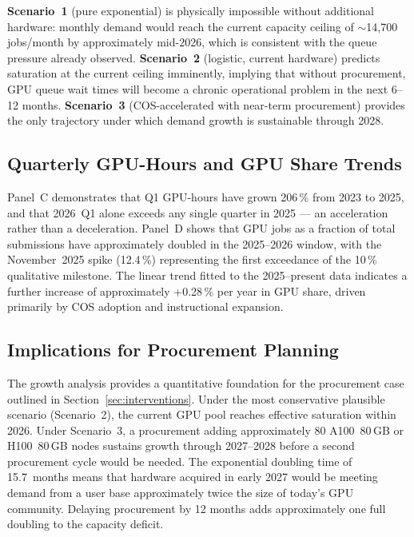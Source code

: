 \documentclass[11pt,letterpaper]{article}
\begin{document}
\textbf{Scenario~1} (pure exponential) is physically impossible without additional
hardware: monthly demand would reach the current capacity ceiling of $\sim$14,700
jobs/month by approximately mid-2026, which is consistent with the queue pressure
already observed.  \textbf{Scenario~2} (logistic, current hardware) predicts
saturation at the current ceiling imminently, implying that without procurement,
GPU queue wait times will become a chronic operational problem in the next 6--12
months.  \textbf{Scenario~3} (COS-accelerated with near-term procurement) provides
the only trajectory under which demand growth is sustainable through 2028.

\subsection{Quarterly GPU-Hours and GPU Share Trends}

Panel~C demonstrates that Q1 GPU-hours have grown 206\,\% from 2023 to 2025, and
that 2026~Q1 alone exceeds any single quarter in 2025 --- an acceleration rather
than a deceleration.  Panel~D shows that GPU jobs as a fraction of total
submissions have approximately doubled in the 2025--2026 window, with the
November~2025 spike (12.4\,\%) representing the first exceedance of the 10\,\%
qualitative milestone.  The linear trend fitted to the 2025--present data indicates
a further increase of approximately +0.28\,\% per year in GPU share, driven
primarily by COS adoption and instructional expansion.

\subsection{Implications for Procurement Planning}

The growth analysis provides a quantitative foundation for the procurement case
outlined in Section~\ref{sec:interventions}.  Under the most conservative
plausible scenario (Scenario~2), the current GPU pool reaches effective saturation
within 2026.  Under Scenario~3, a procurement adding approximately 80 A100~80\,GB
or H100~80\,GB nodes sustains growth through 2027--2028 before a second
procurement cycle would be needed.  The exponential doubling time of 15.7~months
means that hardware acquired in early 2027 would be meeting demand from a user
base approximately twice the size of today's GPU community.  Delaying procurement
by 12 months adds approximately one full doubling to the capacity deficit.

\end{document}
